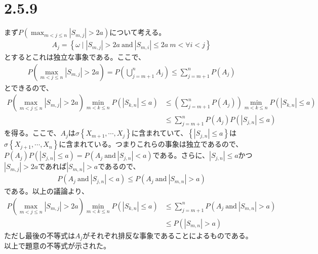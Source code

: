 \documentclass{article}
\begin{document}
\section{2.5.9}
まず$P\left( \max_{m<j\leq n} \left|S_{m,j}\right| > 2a \right)$について考える。
\begin{align*}
	A_j = \left\{ \omega\mid \left| S_{m,j} \right| > 2a\ \text{and}\ \left| S_{m,i} \right| \leq 2a\ m < \forall i < j \right\}
\end{align*}
とするとこれは独立な事象である。ここで、
\begin{align*}
	P\left( \max_{m<j\leq n} \left|S_{m,j}\right| > 2a \right) = P\left( \bigcup_{j=m+1}^n A_j \right) \leq \sum_{j=m+1}^n P\left( A_j \right)
\end{align*}
とできるので、
\begin{align*}
	P\left( \max_{m<j\leq n} \left|S_{m,j}\right| > 2a \right) \min_{m<k \leq n}P\left( \left| S_{k, n} \right| \leq a \right) &\leq \left(\sum_{j=m+1}^n P\left( A_j \right) \right)  \min_{m<k \leq n}P\left( \left| S_{k, n} \right| \leq a \right)\\[10pt]
	&\leq \sum_{j=m+1}^n P\left( A_j \right) P\left( \left| S_{j,n} \right| \leq a \right)
\end{align*}
を得る。ここで、$A_j$は$\sigma\left\{ X_{m+1}, \cdots, X_j \right\}$に含まれていて、$\left\{ \left| S_{j,n} \right| \leq a \right\}$は$\sigma\left\{ X_{j+1}, \cdots, X_n \right\}$に含まれている。つまりこれらの事象は独立であるので、$P\left( A_j \right) P\left( \left| S_{j,n} \right| \leq a \right) = P\left( A_j \ \text{and}\ \left| S_{j,n} \right| < a \right)$である。さらに、$\left| S_{j,n} \right| \leq a$かつ$ \left| S_{m,j} \right| > 2a$であれば$ \left| S_{m,n} \right| > a$であるので、
\begin{align*}
	P\left( A_j \ \text{and}\ \left| S_{j,n} \right| < a \right) \leq P\left( A_j \ \text{and}\ \left| S_{m,n} \right| > a \right)
\end{align*}
である。以上の議論より、
\begin{align*}
	P\left( \max_{m<j\leq n} \left|S_{m,j}\right| > 2a \right) \min_{m<k \leq n}P\left( \left| S_{k, n} \right| \leq a \right) &\leq \sum_{j=m+1}^n P\left( A_j \ \text{and}\ \left| S_{m,n} \right| > a \right)\\[10pt]
	&\leq P\left( \left| S_{m,n} \right| > a \right)
\end{align*}
ただし最後の不等式は$A_j$がそれぞれ排反な事象であることによるものである。以上で題意の不等式が示された。
\end{document}
